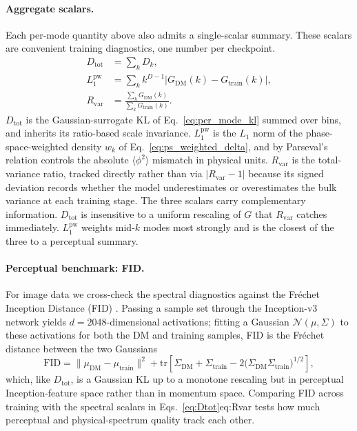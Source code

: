 \documentclass[reprint,twocolumn,superscriptaddress,preprintnumbers,amsmath,amssymb,aps,prd,floatfix]{revtex4-2}
\def\Eq#1{Eq.~\eqref{#1}}
\def\Eqs#1{Eqs.~\eqref{#1}}
\begin{document}
\paragraph{Aggregate scalars.}
Each per-mode quantity above also admits a single-scalar summary. These scalars are convenient training diagnostics, one number per checkpoint.
\begin{align}
D_{\mathrm{tot}} &= \sum_k D_k,
  \label{eq:Dtot}\\
L_1^{\mathrm{pw}} &= \sum_k k^{D-1}\bigl|G_{\mathrm{DM}}(k)-G_{\mathrm{train}}(k)\bigr|,
  \label{eq:L1pw}\\
R_{\mathrm{var}} &= \frac{\sum_k G_{\mathrm{DM}}(k)}{\sum_k G_{\mathrm{train}}(k)}.
  \label{eq:Rvar}
\end{align}
$D_{\mathrm{tot}}$ is the Gaussian-surrogate KL of \Eq{eq:per_mode_kl} summed over bins, and inherits its ratio-based scale invariance. $L_1^{\mathrm{pw}}$ is the $L_1$ norm of the phase-space-weighted density $w_k$ of \Eq{eq:ps_weighted_delta}, and by Parseval's relation controls the absolute $\langle\phi^2\rangle$ mismatch in physical units. $R_{\mathrm{var}}$ is the total-variance ratio, tracked directly rather than via $|R_{\mathrm{var}}-1|$ because its signed deviation records whether the model underestimates or overestimates the bulk variance at each training stage. The three scalars carry complementary information. $D_{\mathrm{tot}}$ is insensitive to a uniform rescaling of $G$ that $R_{\mathrm{var}}$ catches immediately. $L_1^{\mathrm{pw}}$ weights mid-$k$ modes most strongly and is the closest of the three to a perceptual summary.

\paragraph{Perceptual benchmark: FID.}
For image data we cross-check the spectral diagnostics against the Fréchet Inception Distance (FID) \cite{Heusel2017FID}. Passing a sample set through the Inception-v3 network yields $d=2048$-dimensional activations; fitting a Gaussian $\mathcal{N}(\mu, \Sigma)$ to these activations for both the DM and training samples, FID is the Fréchet distance between the two Gaussians
\begin{equation}
\mathrm{FID} = \|\mu_{\mathrm{DM}}-\mu_{\mathrm{train}}\|^2
  + \mathrm{tr}\!\left[\Sigma_{\mathrm{DM}}+\Sigma_{\mathrm{train}}
    -2\bigl(\Sigma_{\mathrm{DM}}\Sigma_{\mathrm{train}}\bigr)^{1/2}\right],
\label{eq:fid}
\end{equation}
which, like $D_{\mathrm{tot}}$, is a Gaussian KL up to a monotone rescaling but in perceptual Inception-feature space rather than in momentum space. Comparing FID across training with the spectral scalars in \Eqs{eq:Dtot}{eq:Rvar} tests how much perceptual and physical-spectrum quality track each other.
\end{document}
